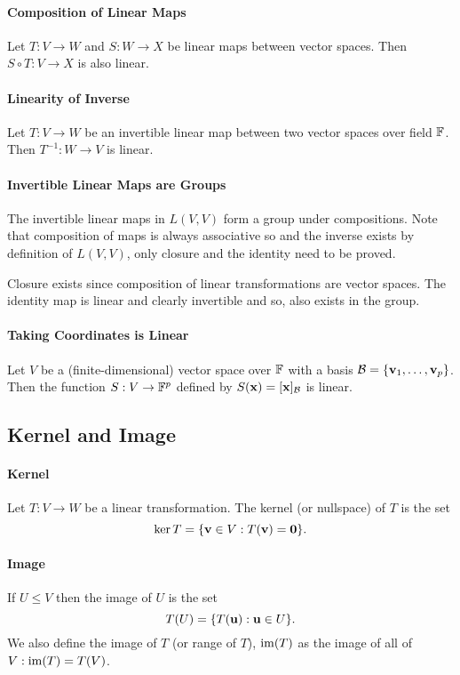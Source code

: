 \paragraph{Composition of Linear Maps}
Let \(T: V \to W\) and \(S:W \to X\) be linear maps between vector spaces. Then \(S \circ T: V \to X\) is also linear.

\paragraph{Linearity of Inverse}
Let \(T: V \to W\) be an invertible linear map between two vector spaces over field \(\mathbb{F}\). Then \(T^{-1}: W \to V\) is linear.

\paragraph{Invertible Linear Maps are Groups}
The invertible linear maps in \(L(V,V)\) form a group under compositions. Note that composition of maps is always associative so and the inverse exists by definition of \(L(V, V)\), only closure and the identity need to be proved.

Closure exists since composition of linear transformations are vector spaces. The identity map is linear and clearly invertible and so, also exists in the group.

\paragraph{Taking Coordinates is Linear}
Let \(V\) be a (finite-dimensional) vector space over \(\mathbb{F}\) with a basis \(\mathcal{B} = \{\mathbf{v}_1, \dots, \mathbf{v}_p\}\). Then the function \(S: V \to \mathbb{F}^p\) defined by \(S(\mathbf{x}) = [\mathbf{x}]_\mathcal{B}\) is linear.

\subsection{Kernel and Image}
\paragraph{Kernel} 
Let \(T: V \to W\) be a linear transformation. The kernel (or nullspace) of \(T\) is the set
\[\ker T = \{\mathbf{v} \in V: T(\mathbf{v}) = \mathbf{0}\}.\]

\paragraph{Image}
If \(U \leq V\) then the image of \(U\) is the set
\[T(U) = \{T(\mathbf{u}) : \mathbf{u}\in U\}.\]
We also define the image of \(T\) (or range of \(T\)), \(\operatorname{im}(T)\) as the image of all of \(V:\operatorname{im}(T) = T(V)\).

